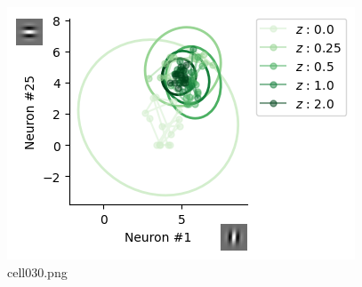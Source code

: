 \begin{figure}[ht]
	\centering
	\includegraphics[scale=0.8, max width=\linewidth]{./fig/bayesian-brain/neural-sampling/cell030.png}
	\caption{cell030.png}
	\label{cell030.png}
\end{figure}